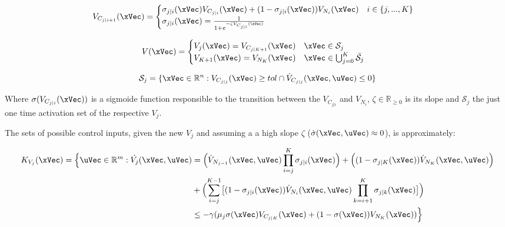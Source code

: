 \begin{align}
    V_{C_{j|i+1}}(\xVec) = 
    \begin{cases}
        \sigma_{j|i}(\xVec) V_{C_{j|i}}(\xVec) + (1 - \sigma_{j|i}(\xVec))V_{N_{i}}(\xVec) \quad i \in \{j,...,K\}\\
        \sigma_{j|i}(\xVec) = \frac{1}{1+e^{-\zeta V_{C_{j|i}}(\xVec)}} 
    \end{cases}
    \label{eq:1stPhase_New_M-CLF-S}
\end{align}

\begin{align}
    V(\xVec) = 
    \begin{cases}
        V_j(\xVec) = V_{C_{j|K+1}}(\xVec) \quad \xVec \in \mathcal{S}_j\\
        V_{K+1}(\xVec) = V_{N_{K}}(\xVec) \quad \xVec \in \bigcup^{K}_{j=0} \bar{\mathcal{S}_j}
    \end{cases}
    \label{eq:New_M-CLF-S}
\end{align}

\begin{equation}
    \mathcal{S}_j = \{\xVec \in \mathbb{R}^n: V_{C_{j|j}}(\xVec) \geq tol \cap \dot{V}_{C_{j|j}}(\xVec, \uVec) \leq 0 \}
    \label{eq:New_M-CLF-S_actuationPhaseSet}
\end{equation}

Where \(\sigma(V_{C_{j|i}}(\xVec))\) is a sigmoide function responsible to the transition between the  \(V_{C_{j|i}}\) and \(V_{N_{i}}\), \(\zeta \in \mathbb{R}_{\geq 0}\) is its slope and \(\mathcal{S}_j\) the just one time activation set of the respective  \(V_j\). 



The sets of possible control inputs, given the new  \(V_j\) and assuming a a high slope \(\zeta\) (\(\dot{\sigma}(\xVec, \uVec)\approx 0\)), is approximately:

\begin{align}
    K_{V_{j}}(\xVec) = \Bigl\{\uVec \in \mathbb{R}^m: \dot{V_j}(\xVec, \uVec) &= \Bigl(\dot{V}_{N_{j-1}}(\xVec, \uVec) \prod^K_{i=j}\sigma_{j|i}(\xVec)\Bigr) + \Bigl((1-\sigma_{j|K}(\xVec))\dot{V}_{N_{K}}(\xVec, \uVec)\Bigr) \notag \\
    &+\Bigl(\sum_{i=j}^{K-1} \bigl[(1-\sigma_{j|i}(\xVec))\dot{V}_{N_{i}}(\xVec, \uVec) \prod^K_{k=i+1} \sigma_{j|k}(\xVec)\bigr]\Bigr) \notag\\
    &\leq -\gamma( \mu_{j}\sigma(\xVec) V_{C_{j|K}}(\xVec) + (1 - \sigma(\xVec))V_{N_{K}}(\xVec)  )\Bigr\}
    \label{eq:M-CLF-S_Constraint}
\end{align}

